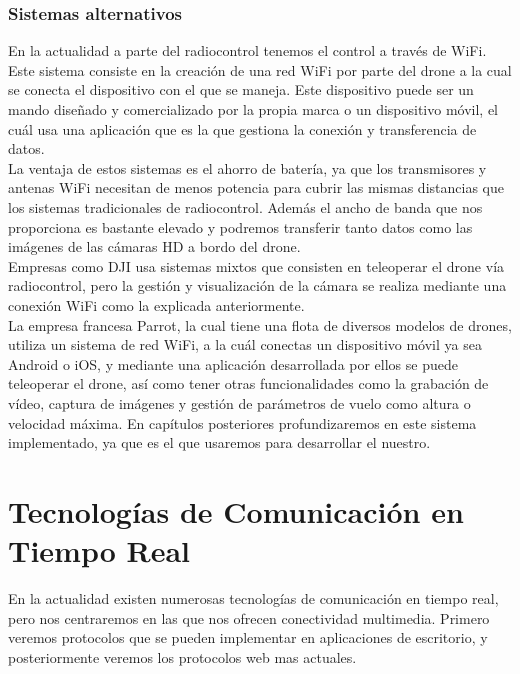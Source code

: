\subsubsection{Sistemas alternativos}

En la actualidad a parte del radiocontrol tenemos el control a través de WiFi. Este sistema consiste en la creación de una red WiFi por parte del drone a la cual se conecta el dispositivo con el que se maneja. Este dispositivo puede ser un mando diseñado y comercializado por la propia marca o un dispositivo móvil, el cuál usa una aplicación que es la que gestiona la conexión y transferencia de datos.\\

La ventaja de estos sistemas es el ahorro de batería, ya que los transmisores y antenas WiFi necesitan de menos potencia para cubrir las mismas distancias que los sistemas tradicionales de radiocontrol. Además el ancho de banda que nos proporciona es bastante elevado y podremos transferir tanto datos como las imágenes de las cámaras HD a bordo del drone.\\

Empresas como DJI usa sistemas mixtos que consisten en teleoperar el drone vía radiocontrol, pero la gestión y visualización de la cámara se realiza mediante una conexión WiFi como la explicada anteriormente.\\
 
La empresa francesa Parrot, la cual tiene una flota de diversos modelos de drones, utiliza un sistema de red WiFi, a la cuál conectas un dispositivo móvil ya sea Android o iOS, y mediante una aplicación desarrollada por ellos se puede teleoperar el drone, así como tener otras funcionalidades como la grabación de vídeo, captura de imágenes y gestión de parámetros de vuelo como altura o velocidad máxima. En capítulos posteriores profundizaremos en este sistema implementado, ya que es el que usaremos para desarrollar el nuestro.\\



\section{Tecnologías de Comunicación en Tiempo Real}

En la actualidad  existen numerosas tecnologías de comunicación en tiempo real, pero nos centraremos en las que nos ofrecen conectividad multimedia. Primero veremos protocolos que se pueden implementar en aplicaciones de escritorio, y posteriormente veremos los protocolos web mas actuales.\\

